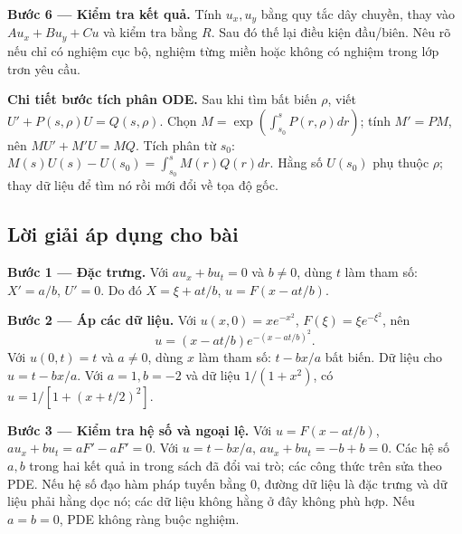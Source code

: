 \documentclass[10pt,a4paper]{article}
\begin{document}
\textbf{Bước 6 — Kiểm tra kết quả.} Tính $u_x,u_y$ bằng quy tắc dây chuyền, thay vào $Au_x+Bu_y+Cu$ và kiểm tra bằng $R$. Sau đó thế lại điều kiện đầu/biên. Nêu rõ nếu chỉ có nghiệm cục bộ, nghiệm từng miền hoặc không có nghiệm trong lớp trơn yêu cầu.

\textbf{Chi tiết bước tích phân ODE.} Sau khi tìm bất biến $\rho$, viết $U'+P(s,\rho)U=Q(s,\rho)$. Chọn $M=\exp(\int_{s_0}^{s}P(r,\rho)dr)$; tính $M'=PM$, nên $MU'+M'U=MQ$. Tích phân từ $s_0$: $M(s)U(s)-U(s_0)=\int_{s_0}^sM(r)Q(r)dr$. Hằng số $U(s_0)$ phụ thuộc $\rho$; thay dữ liệu để tìm nó rồi mới đổi về tọa độ gốc.
\subsection*{Lời giải áp dụng cho bài}
\textbf{Bước 1 — Đặc trưng.} Với $au_x+bu_t=0$ và $b\ne0$, dùng $t$ làm tham số: $X'=a/b$, $U'=0$. Do đó $X=\xi+at/b$, $u=F(x-at/b)$.

\textbf{Bước 2 — Áp các dữ liệu.} Với $u(x,0)=xe^{-x^2}$, $F(\xi)=\xi e^{-\xi^2}$, nên
\[u=(x-at/b)e^{-(x-at/b)^2}.\]
Với $u(0,t)=t$ và $a\ne0$, dùng $x$ làm tham số: $t-bx/a$ bất biến. Dữ liệu cho $u=t-bx/a$. Với $a=1,b=-2$ và dữ liệu $1/(1+x^2)$, có $u=1/[1+(x+t/2)^2]$.

\textbf{Bước 3 — Kiểm tra hệ số và ngoại lệ.} Với $u=F(x-at/b)$, $au_x+bu_t=aF'-aF'=0$. Với $u=t-bx/a$, $au_x+bu_t=-b+b=0$. Các hệ số $a,b$ trong hai kết quả in trong sách đã đổi vai trò; các công thức trên sửa theo PDE. Nếu hệ số đạo hàm pháp tuyến bằng 0, đường dữ liệu là đặc trưng và dữ liệu phải hằng dọc nó; các dữ liệu không hằng ở đây không phù hợp. Nếu $a=b=0$, PDE không ràng buộc nghiệm.
\end{document}
